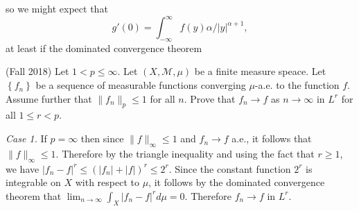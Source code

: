 \documentclass[answers]{exam}
\begin{document}
\begin{questions}
\begin{parts}
\begin{solution}
        
        so we might expect that
        \[ g'(0) = \int_{-\infty}^\infty f(y) \alpha / |y|^{\alpha+1}, \]
        at least if the dominated convergence theorem
    \end{solution}
\end{parts}

\question (Fall 2018)
  Let $1<p\leq \infty$. Let $(X,\mathcal{M},\mu)$ be a finite measure speace. Let $\left\{ f_{n} \right\}$ be a sequence of measurable functions converging $\mu$-a.e. to the function $f$. Assume further that $\| f_{n} \|_{p}\leq 1$ for all $n$. Prove that $f_{n}\to f$ as $n\to \infty$ in $L^{r}$ for all $1\leq r<p$.
\begin{solution}
  \textit{Case 1.} If $p=\infty$ then since $\| f \|_{\infty}\leq 1$ and $f_{n}\to f$ a.e., it follows that $\| f \|_{\infty}\leq 1$. Therefore by the triangle inequality and using the fact that $r\geq 1$, we have $|f_{n}-f|^{r}\leq (|f_{n}| + |f| )^{r}\leq 2^{r}$. Since the constant function $2^{r}$ is integrable on $X$ with respect to $\mu$, it follows by the dominated convergence theorem that $\lim_{n\to\infty}\int_{X} |f_{n}-f|^{r}d\mu = 0$. Therefore $f_{n}\to f$ in $L^{r}$.


\end{solution}
\end{questions}
\end{document}
